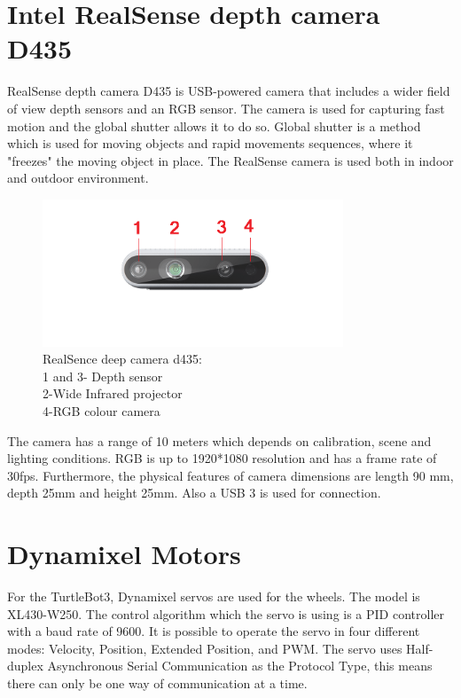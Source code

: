 \section{Intel RealSense depth camera  D435}

RealSense depth camera D435 is USB-powered camera that includes a wider field of view depth sensors and an RGB sensor. The camera is used for capturing fast motion and the global shutter allows it to do so. Global shutter is a method which is used for moving objects and rapid movements sequences, where it "freezes" the moving object in place. The RealSense camera is used both in indoor and outdoor environment.\\ 

\begin{figure}[H]
\centering
\includegraphics[width=0.8\textwidth]{Figures/ConAnalysis/General/real.png}
\caption{RealSence deep camera d435:\\ 1 and 3- Depth sensor \\ 2-Wide Infrared projector  \\ 4-RGB colour camera}
\label{fig:realsence}
\end{figure}

The camera has a range of 10 meters which depends on calibration, scene and lighting conditions. RGB is up to 1920*1080 resolution and has a frame rate of 30fps. Furthermore, the physical features of camera dimensions are length 90 mm, depth 25mm and height 25mm. Also a USB 3 is used for connection. \\


\section{Dynamixel Motors} 
For the TurtleBot3, Dynamixel servos are used for the wheels. The model is XL430-W250. The control algorithm which the servo is using is a PID controller with a baud rate of 9600. It is possible to operate the servo in four different modes: Velocity, Position, Extended Position, and PWM. The servo uses Half-duplex Asynchronous Serial Communication as the Protocol Type, this means there can only be one way of communication at a time.\cite{DynamixelServo}
\color{black}